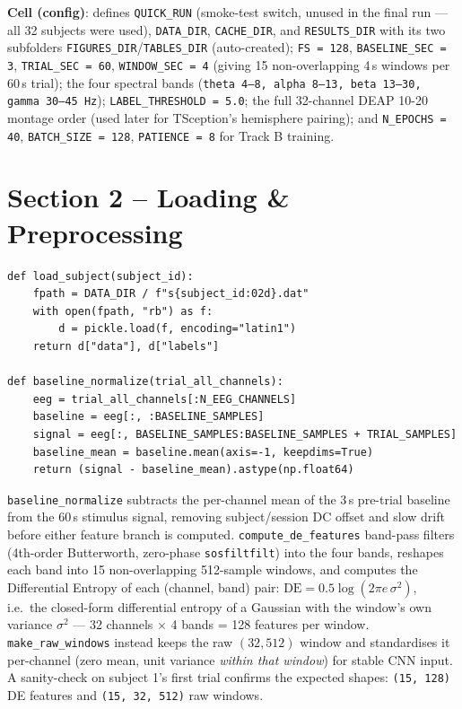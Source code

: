 \documentclass[11pt]{report}
\begin{document}
\textbf{Cell (config)}: defines \texttt{QUICK\_RUN} (smoke-test switch, unused
in the final run --- all 32 subjects were used), \texttt{DATA\_DIR},
\texttt{CACHE\_DIR}, and \texttt{RESULTS\_DIR} with its two subfolders
\texttt{FIGURES\_DIR}/\texttt{TABLES\_DIR} (auto-created); \texttt{FS = 128},
\texttt{BASELINE\_SEC = 3}, \texttt{TRIAL\_SEC = 60},
\texttt{WINDOW\_SEC = 4} (giving 15 non-overlapping 4\,s windows per 60\,s
trial); the four spectral bands (\texttt{theta 4--8, alpha 8--13, beta
13--30, gamma 30--45\,Hz}); \texttt{LABEL\_THRESHOLD = 5.0}; the full
32-channel DEAP 10-20 montage order (used later for TSception's hemisphere
pairing); and \texttt{N\_EPOCHS = 40}, \texttt{BATCH\_SIZE = 128},
\texttt{PATIENCE = 8} for Track B training.

\section{Section 2 -- Loading \& Preprocessing}
\begin{lstlisting}
def load_subject(subject_id):
    fpath = DATA_DIR / f"s{subject_id:02d}.dat"
    with open(fpath, "rb") as f:
        d = pickle.load(f, encoding="latin1")
    return d["data"], d["labels"]

def baseline_normalize(trial_all_channels):
    eeg = trial_all_channels[:N_EEG_CHANNELS]
    baseline = eeg[:, :BASELINE_SAMPLES]
    signal = eeg[:, BASELINE_SAMPLES:BASELINE_SAMPLES + TRIAL_SAMPLES]
    baseline_mean = baseline.mean(axis=-1, keepdims=True)
    return (signal - baseline_mean).astype(np.float64)
\end{lstlisting}
\texttt{baseline\_normalize} subtracts the per-channel mean of the 3\,s
pre-trial baseline from the 60\,s stimulus signal, removing subject/session
DC offset and slow drift before either feature branch is computed.
\texttt{compute\_de\_features} band-pass filters (4th-order Butterworth,
zero-phase \texttt{sosfiltfilt}) into the four bands, reshapes each band into
15 non-overlapping 512-sample windows, and computes the Differential Entropy
of each (channel, band) pair: $\text{DE} = 0.5 \log(2\pi e \, \sigma^2)$,
i.e.\ the closed-form differential entropy of a Gaussian with the window's
own variance $\sigma^2$ --- 32 channels $\times$ 4 bands = 128 features per
window. \texttt{make\_raw\_windows} instead keeps the raw $(32, 512)$ window
and standardises it per-channel (zero mean, unit variance \emph{within that
window}) for stable CNN input. A sanity-check on subject 1's first trial
confirms the expected shapes: \texttt{(15, 128)} DE features and
\texttt{(15, 32, 512)} raw windows.
\end{document}

